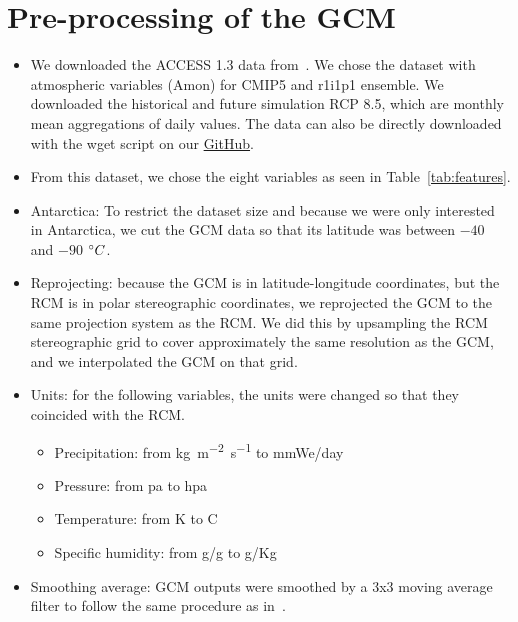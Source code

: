 \documentclass[a4paper,11pt,oneside]{report}
\begin{document}
\section{Pre-processing of the GCM}\label{sec:preproc-GCM}
\begin{itemize}
    \item We downloaded the ACCESS 1.3 data from~\cite{NCI}. We chose the dataset with atmospheric variables (Amon) for CMIP5 and r1i1p1 ensemble. We downloaded the historical and future simulation RCP 8.5, which are monthly mean aggregations of daily values. The data can also be directly downloaded with the wget script on our \href{https://github.com/marvande/master-thesis}{GitHub}. 
    \item From this dataset, we chose the eight variables as seen in Table~\ref{tab:features}. 
    \item Antarctica: To restrict the dataset size and because we were only interested in Antarctica, we cut the GCM data so that its latitude was between $-40$ and $-90$ $\degree C$. 
    \item Reprojecting: because the GCM is in latitude-longitude coordinates, but the RCM is in polar stereographic coordinates, we reprojected the GCM to the same projection system as the RCM. We did this by upsampling the RCM stereographic grid to cover approximately the same resolution as the GCM, and we interpolated the GCM on that grid. 
    \item Units: for the following variables, the units were changed so that they coincided with the RCM. 
    \begin{itemize}
        \item Precipitation: from \si{kg m^{-2}s^{-1}} to \si{mmWe/day}
        \item Pressure: from \si{pa} to \si{hpa}
        \item Temperature: from \si{K} to \si{C}
        \item Specific humidity: from \si{g/g} to \si{g/Kg}
    \end{itemize}
    \item Smoothing average: GCM outputs were smoothed by a 3x3 moving average filter to follow the same procedure as in~\cite{Doury}. 
\end{itemize}
\end{document}
